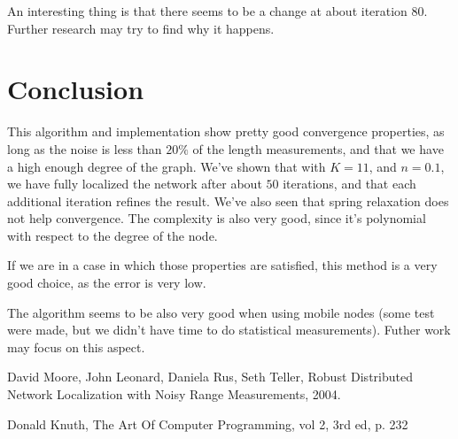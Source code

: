 \documentclass[letterpaper, 10 pt, conference]{ieeeconf}  %
\begin{document}
An interesting thing is that there seems to be a change at about iteration $80$. Further research may try to find why it happens.


\section{Conclusion}

This algorithm and implementation show pretty good convergence properties, as long as the noise is less than $20\%$ of the length measurements, and that we have a high enough degree of the graph. We've shown that with $K=11$, and $n=0.1$, we have fully localized the network after about $50$ iterations, and that each additional iteration refines the result. We've also seen that spring relaxation does not help convergence. The complexity is also very good, since it's polynomial with respect to the degree of the node.

If we are in a case in which those properties are satisfied, this method is a very good choice, as the error is very low.

The algorithm seems to be also very good when using mobile nodes (some test were made, but we didn't have time to do statistical measurements). Futher work may focus on this aspect.



\begin{thebibliography}{99}

 David Moore, John Leonard, Daniela Rus, Seth Teller, Robust Distributed Network Localization with Noisy Range Measurements, 2004.

 Donald Knuth, The Art Of Computer Programming, vol 2, 3rd ed, p. 232





\end{thebibliography}
\end{document}
